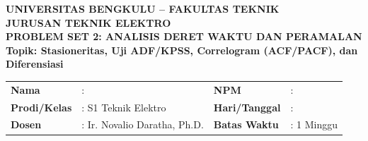 \documentclass[11pt,a4paper]{article}
\begin{document}
\begin{center}
    {\large \textbf{\color{primaryblue}UNIVERSITAS BENGKULU -- FAKULTAS TEKNIK}}\\[0.1cm]
    {\large \textbf{\color{secondaryblue}JURUSAN TEKNIK ELEKTRO}}\\[0.2cm]
    {\LARGE \textbf{\color{primaryblue}PROBLEM SET 2: ANALISIS DERET WAKTU DAN PERAMALAN}}\\[0.1cm]
    {\normalsize \textbf{Topik: Stasioneritas, Uji ADF/KPSS, Correlogram (ACF/PACF), dan Diferensiasi}}
\end{center}

\vspace{0.1cm}

\begin{tcolorbox}[colback=boxbg,colframe=primaryblue,arc=2mm,title=\textbf{Informasi Tugas \& Identitas Mahasiswa}]
\small
\begin{tabular}{p{2.2cm}p{5.5cm}p{2.2cm}p{5.0cm}}
\textbf{Nama} & : \dotfill & \textbf{NPM} & : \dotfill \\
\textbf{Prodi/Kelas} & : S1 Teknik Elektro & \textbf{Hari/Tanggal} & : \dotfill \\
\textbf{Dosen} & : Ir. Novalio Daratha, Ph.D. & \textbf{Batas Waktu} & : 1 Minggu \\
\end{tabular}
\end{tcolorbox}

\vspace{0.2cm}
\end{document}
